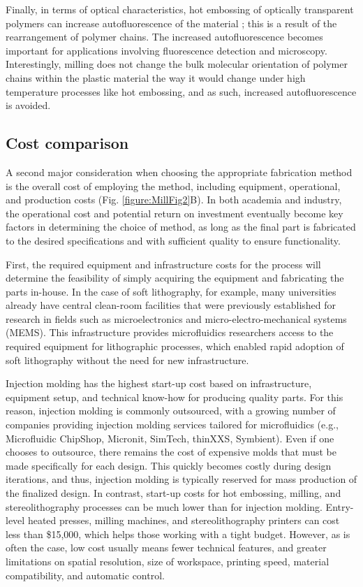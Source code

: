 {Finally, in terms of optical characteristics, hot embossing of optically transparent polymers can increase autofluorescence of the material \cite{Young2012}; this is a result of the rearrangement of polymer chains. The increased autofluorescence becomes important for applications involving fluorescence detection and microscopy. Interestingly, milling does not change the bulk molecular orientation of polymer chains within the plastic material the way it would change under high temperature processes like hot embossing, and as such, increased autofluorescence is avoided.

\subsection{Cost comparison}
A second major consideration when choosing the appropriate fabrication method is the overall cost of employing the method, including equipment, operational, and production costs (Fig. \ref{figure:MillFig2}B). In both academia and industry, the operational cost and potential return on investment eventually become key factors in determining the choice of method, as long as the final part is fabricated to the desired specifications and with sufficient quality to ensure functionality.

First, the required equipment and infrastructure costs for the process will determine the feasibility of simply acquiring the equipment and fabricating the parts in-house. In the case of soft lithography, for example, many universities already have central clean-room facilities that were previously established for research in fields such as microelectronics and micro-electro-mechanical systems (MEMS). This infrastructure provides microfluidics researchers access to the required equipment for lithographic processes, which enabled rapid adoption of soft lithography without the need for new infrastructure.

Injection molding has the highest start-up cost based on infrastructure, equipment setup, and technical know-how for producing quality parts. For this reason, injection molding is commonly outsourced, with a growing number of companies providing injection molding services tailored for microfluidics (e.g., Microfluidic ChipShop, Micronit, SimTech, thinXXS, Symbient). Even if one chooses to outsource, there remains the cost of expensive molds that must be made specifically for each design. This quickly becomes costly during design iterations, and thus, injection molding is typically reserved for mass production of the finalized design. In contrast, start-up costs for hot embossing, milling, and stereolithography processes can be much lower than for injection molding. Entry-level heated presses, milling machines, and stereolithography printers can cost less than \$15,000, which helps those working with a tight budget. However, as is often the case, low cost usually means fewer technical features, and greater limitations on spatial resolution, size of workspace, printing speed, material compatibility, and automatic control. 

}
